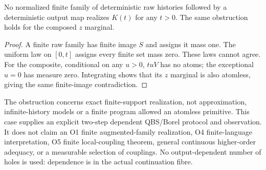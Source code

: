 \begin{proposition}
No normalized finite family of deterministic raw histories followed by
a deterministic output map realizes $K(t)$ for any $t>0$. The same
obstruction holds for the composed $z$ marginal.
\end{proposition}
\begin{proof}
A finite raw family has finite image $S$ and assigns it mass one.
The uniform law on $[0,t]$ assigns every finite set mass zero.
These laws cannot agree. For the composite, conditional on any $u>0$,
$tuV$ has no atoms; the exceptional $u=0$ has measure zero.
Integrating shows that its $z$ marginal is also atomless, giving the
same finite-image contradiction.
\end{proof}
The obstruction concerns exact finite-support realization, not
approximation, infinite-history models or a finite program allowed an
atomless primitive. This case supplies an explicit two-step dependent
QBS/Borel protocol and observation. It does not claim an O1 finite
augmented-family realization, O4 finite-language interpretation, O5
finite local-coupling theorem, general continuous higher-order adequacy,
or a measurable selection of couplings. No output-dependent number of
holes is used: dependence is in the actual continuation fibre.

